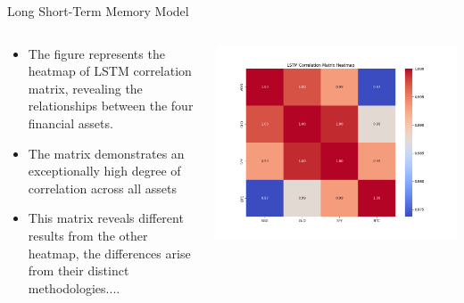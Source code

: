     \begin{frame}{Long Short-Term Memory Model}
        \begin{columns}
        \begin{column}{0.5\textwidth}
        \begin{itemize}
            \item<1-> The figure represents the heatmap of LSTM correlation matrix, revealing the relationships between the four financial assets.
            \item<2-> The matrix demonstrates an exceptionally high degree of correlation across all assets
            \item<3-> This matrix reveals different results from the other heatmap, the differences arise from their distinct methodologies....
        \end{itemize}
        \end{column}
        \begin{column}{0.5\textwidth}  %
            \begin{center}
             \includegraphics[width=\textwidth]{src/models/results/lstm_correlation_heatmap_with_labels.png}
             \end{center}
        \end{column}
        \end{columns}
    \end{frame}


  
    
    